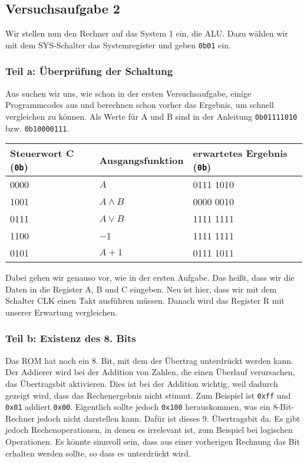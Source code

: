 \subsection{Versuchsaufgabe 2}

Wir stellen nun den Rechner auf das System 1 ein, die ALU. Dazu wählen wir mit
dem SYS-Schalter das Systemregister und geben \texttt{0b01} ein.

\subsubsection{Teil a: Überprüfung der Schaltung}

Aus \cite[Tabelle~8.2]{physik313-Anleitung} suchen wir uns, wie schon in der
ersten Versuchsaufgabe, einige Programmcodes aus und berechnen schon vorher das
Ergebnis, um schnell vergleichen zu können. Als Werte für A und B sind in der
Anleitung \texttt{0b01111010} bzw. \texttt{0b10000111}.

\begin{tabular}{lll}
	Steuerwort C (\texttt{0b}) & Ausgangsfunktion & erwartetes Ergebnis
	(\texttt{0b}) \\
	\hline
	0000 & $A$ & 0111 1010 \\
	1001 & $A \wedge B$ & 0000 0010 \\
	0111 & $A \vee B$ & 1111 1111 \\
	1100 & \num{-1} & 1111 1111 \\
	0101 & $A + 1$ & 0111 1011
\end{tabular}

Dabei gehen wir genauso vor, wie in der ersten Aufgabe. Das heißt, dass wir die
Daten in die Register A, B und C eingeben. Neu ist hier, dass wir mit dem
Schalter CLK einen Takt ausführen müssen. Danach wird das Register R mit
unserer Erwartung vergleichen.

\subsubsection{Teil b: Existenz des 8. Bits}

Das ROM hat noch ein 8. Bit, mit dem der Übertrag unterdrückt werden kann. Der
Addierer wird bei der Addition von Zahlen, die einen Überlauf verursachen, das
Übertragsbit aktivieren. Dies ist bei der Addition wichtig, weil dadurch
gezeigt wird, dass das Rechenergebnis nicht stimmt. Zum Beispiel ist
\texttt{0xff} und \texttt{0x01} addiert \texttt{0x00}. Eigentlich sollte jedoch
\texttt{0x100} herauskommen, was ein 8-Bit-Rechner jedoch nicht darstellen
kann. Dafür ist dieses 9. Übertragsbit da. Es gibt jedoch Rechenoperationen, in
denen es irrelevant ist, zum Beispiel bei logischen Operationen. Es könnte
sinnvoll sein, dass aus einer vorherigen Rechnung das Bit erhalten werden
sollte, so dass es unterdrückt wird.


